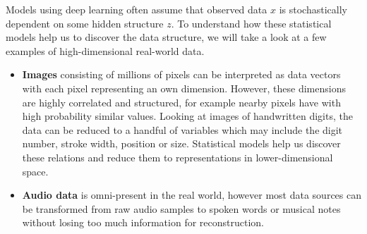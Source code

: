 

Models using deep learning often assume that observed data $x$ is stochastically dependent on some hidden structure $z$.
To understand how these statistical models help us to discover the data structure, we will take a look at a few examples of high-dimensional real-world data.

\begin{itemize}
  \item \textbf{Images} consisting of millions of pixels can be interpreted as data vectors with each pixel representing an own dimension.
  However, these dimensions are highly correlated and structured, for example nearby pixels have with high probability similar values.
  Looking at images of handwritten digits, the data can be reduced to a handful of variables which may include the digit number, stroke width, position or size.
  Statistical models help us discover these relations and reduce them to representations in lower-dimensional space.
  \item \textbf{Audio data} is omni-present in the real world, however most data sources can be transformed from raw audio samples to spoken words or musical notes without losing too much information for reconstruction.
\end{itemize}

